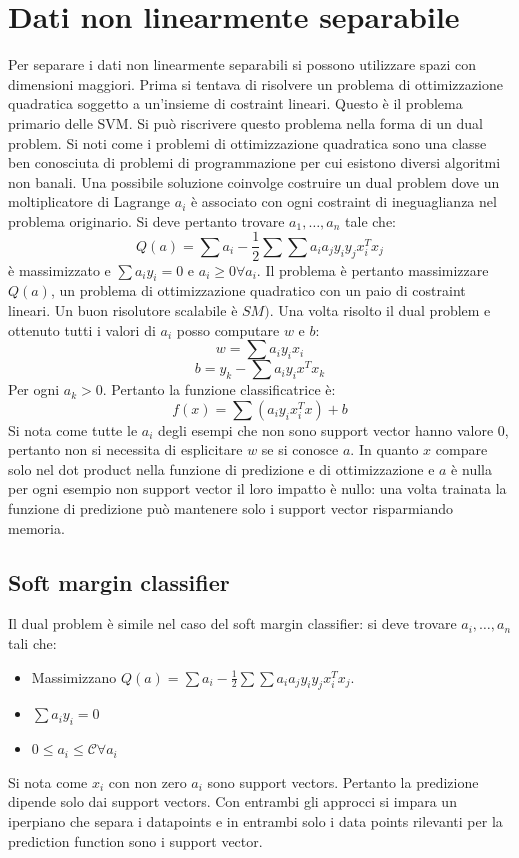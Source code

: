 \section{Dati non linearmente separabile}
Per separare i dati non linearmente separabili si possono utilizzare spazi con dimensioni maggiori.
Prima si tentava di risolvere un problema di ottimizzazione quadratica soggetto a un'insieme di costraint lineari.
Questo \`e il problema primario delle SVM.
Si pu\`o riscrivere questo problema nella forma di un dual problem.
Si noti come i problemi di ottimizzazione quadratica sono una classe ben conosciuta di problemi di programmazione per cui esistono diversi algoritmi non banali.
Una possibile soluzione coinvolge costruire un dual problem dove un moltiplicatore di Lagrange $a_i$ \`e associato con ogni costraint di ineguaglianza nel problema originario.
Si deve pertanto trovare $a_1,\dots,a_n$ tale che:
$$Q(a) = \sum a_i - \frac{1}{2}\sum\sum a_ia_jy_iy_jx_i^Tx_j$$
\`e massimizzato e $\sum a_iy_i = 0$ e $a_i\ge 0\forall a_i$.
Il problema \`e pertanto massimizzare $Q(a)$, un problema di ottimizzazione quadratico con un paio di costraint lineari.
Un buon risolutore scalabile \`e $SM)$.
Una volta risolto il dual problem e ottenuto tutti i valori di $a_i$ posso computare $w$ e $b$:
$$w=\sum a_iy_ix_i$$
$$b = y_k - \sum a_iy_ix^Tx_k$$
Per ogni $a_k>0$.
Pertanto la funzione classificatrice \`e:
$$f(x) = \sum(a_iy_ix_i^Tx)+b$$
Si nota come tutte le $a_i$ degli esempi che non sono support vector hanno valore $0$, pertanto non si necessita di esplicitare $w$ se si conosce $a$.
In quanto $x$ compare solo nel dot product nella funzione di predizione e di ottimizzazione e $a$ \`e nulla per ogni esempio non support vector il loro impatto \`e nullo: una volta trainata la funzione di predizione pu\`o mantenere solo i support vector risparmiando memoria.

	\subsection{Soft margin classifier}
	Il dual problem \`e simile nel caso del soft margin classifier: si deve trovare $a_i,\dots, a_n$ tali che:
	\begin{itemize}
		\item Massimizzano $Q(a) = \sum a_i-\frac{1}{2}\sum\sum a_ia_jy_iy_jx_i^Tx_j$.
		\item $\sum a_iy_i = 0$
		\item $0\le a_i\le \mathcal{C}\forall a_i$
	\end{itemize}
	Si nota come $x_i$ con non zero $a_i$ sono support vectors.
	Pertanto la predizione dipende solo dai support vectors.
	Con entrambi gli approcci si impara un iperpiano che separa i datapoints e in entrambi solo i data points rilevanti per la prediction function sono i support vector.
	
